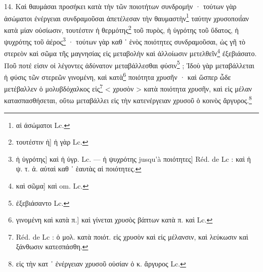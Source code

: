 \documentclass[a4paper, 11pt, oneside, polutonikogreek, french]{article}
\begin{document}
14. Καὶ θαυμάσαι προσήκει κατὰ τὴν τῶν ποιοτήτων συνδρομήν · τούτων γὰρ ἀσώματοι ἐνέργειαι συνδραμοῦσαι ἀπετέλεσαν τὴν θαυμαστὴν\footnote{αἱ άσώματοι Lc.} ταύτην χρυσοποιΐαν κατὰ μίαν οὐσίωσιν, τουτέστιν ἡ θερμότης\footnote{τουτέστιν ἡ] ἡ γὰρ Lc.} τοῦ πυρὸς, ἡ ὑγρότης τοῦ ὕδατος, ἡ ψυχρότης τοῦ ἀέρος\footnote{ἡ ὑγρότης] καὶ ἡ ὑγρ. Lc. --- ἡ ψυχρότης jusqu'à ποιότητες] Réd. de Lc : καὶ ἡ ψ. τ. ἀ. αὐταὶ καθ ᾽ ἑαυτὰς αἱ ποιότητες.} · τούτων γὰρ καθ ᾽ ἑνὸς ποιότητες συνδραμοῦσαι, ὡς γῆ τὸ στερεὸν καὶ σῶμα τῆς μαγνησίας εἰς μεταβολὴν καὶ ἀλλοίωσιν μετελθεῖν\footnote{καὶ σῶμα] καὶ om. Lc.} ἐξεβιάσατο. Ποῦ ποτέ εἰσιν οἱ λέγοντες ἀδύνατον μεταβάλλεσθαι φύσιν\footnote{ἐξεβιάσαντο Lc.} ; Ἰδοὺ γὰρ μεταβάλλεται ἡ φύσις τῶν στερεῶν γινομένη, καὶ κατὰ\footnote{γινομένη καὶ κατὰ π.] καὶ γίνεται χρυσὸς βάπτων κατὰ π. καὶ Lc.} ποιότητα χρυσῆν · καὶ ὥσπερ ὧδε μετέβαλλεν ὁ μολυβδόχαλκος εἰς\footnote{Réd. de Lc : ὁ μολ. κατὰ ποιότ. εἰς χρυσὸν καὶ εἰς μέλανσιν, καὶ λεύκωσιν καὶ ξάνθωσιν κατεσπάσθη.} < χρυσὸν > κατὰ ποιότητα χρυσῆν, καὶ εἰς μέλαν κατασπασθήσεται, οὕτω μεταβάλλει εἰς τὴν κατενέργειαν χρυσοῦ ὁ κοινὸς ἄργυρος.\footnote{εἰς τὴν κατ ᾽ ἐνέργειαν χρυσοῦ οὐσίαν ὁ κ. ἄργυρος Lc.}
\end{document}
